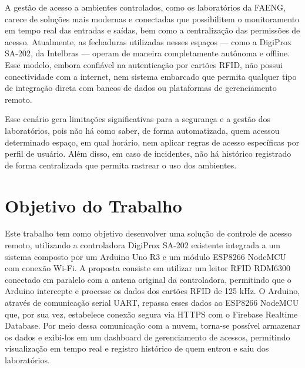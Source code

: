 
\label{Cap:Problema}

A gestão de acesso a ambientes controlados, como os laboratórios da FAENG, carece de soluções mais modernas e conectadas que possibilitem o monitoramento em tempo real das entradas e saídas, bem como a centralização das permissões de acesso. Atualmente, as fechaduras utilizadas nesses espaços — como a DigiProx SA-202, da Intelbras — operam de maneira completamente autônoma e offline. Esse modelo, embora confiável na autenticação por cartões RFID, não possui conectividade com a internet, nem sistema embarcado que permita qualquer tipo de integração direta com bancos de dados ou plataformas de gerenciamento remoto.

Esse cenário gera limitações significativas para a segurança e a gestão dos laboratórios, pois não há como saber, de forma automatizada, quem acessou determinado espaço, em qual horário, nem aplicar regras de acesso específicas por perfil de usuário. Além disso, em caso de incidentes, não há histórico registrado de forma centralizada que permita rastrear o uso dos ambientes.



\section{Objetivo do Trabalho}
\label{Sec:objetivo}
Este trabalho tem como objetivo desenvolver uma solução de controle de acesso remoto, utilizando a controladora DigiProx SA-202 existente integrada a um sistema composto por um Arduino Uno R3 e um módulo ESP8266 NodeMCU com conexão Wi-Fi.
A proposta consiste em utilizar um leitor RFID RDM6300 conectado em paralelo com a antena original da controladora, permitindo que o Arduino intercepte e processe os dados dos cartões RFID de 125 kHz. O Arduino, através de comunicação serial UART, repassa esses dados ao ESP8266 NodeMCU que, por sua vez, estabelece conexão segura via HTTPS com o Firebase Realtime Database. Por meio dessa comunicação com a nuvem, torna-se possível armazenar os dados e exibi-los em um dashboard de gerenciamento de acessos, permitindo visualização em tempo real e registro histórico de quem entrou e saiu dos laboratórios.

